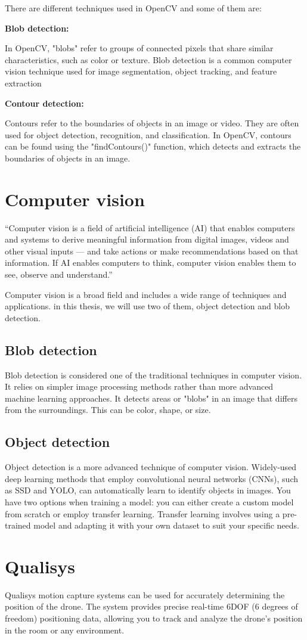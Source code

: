 There are different techniques used in OpenCV and some of them are: 

\textbf{Blob detection:}

In OpenCV, "blobs" refer to groups of connected pixels that share similar characteristics, such as color or texture. Blob detection is a common computer vision technique used for image segmentation, object tracking, and feature extraction

\textbf{Contour detection:} 

Contours refer to the boundaries of objects in an image or video. They are often used for object detection, recognition, and classification. In OpenCV, contours can be found using the "findContours()" function, which detects and extracts the boundaries of objects in an image.


\section{Computer vision}
“Computer vision is a field of artificial intelligence (AI) that enables computers and systems to derive meaningful information from digital images, videos and other visual inputs — and take actions or make recommendations based on that information. If AI enables computers to think, computer vision enables them to see, observe and understand.” \cite{Computer-vision} 

Computer vision is a broad field and includes a wide range of techniques and applications. in this thesis, we will use two of them, object detection and blob detection.

\subsection{Blob detection}
Blob detection is considered one of the traditional techniques in computer vision. It relies on simpler image processing methods rather than more advanced machine learning approaches. It detects areas or "blobs" in an image that differs from the surroundings. This can be color, shape, or size.
\subsection{Object detection}
Object detection is a more advanced technique of computer vision. Widely-used deep learning methods that employ convolutional neural networks (CNNs), such as SSD and YOLO, can automatically learn to identify objects in images. You have two options when training a model: you can either create a custom model from scratch or employ transfer learning. Transfer learning involves using a pre-trained model and adapting it with your own dataset to suit your specific needs.


\section{Qualisys}

Qualisys motion capture systems can be used for accurately determining the position of the drone. The system provides precise real-time 6DOF (6 degrees of freedom) positioning data, allowing you to track and analyze the drone's position in the room or any environment. 